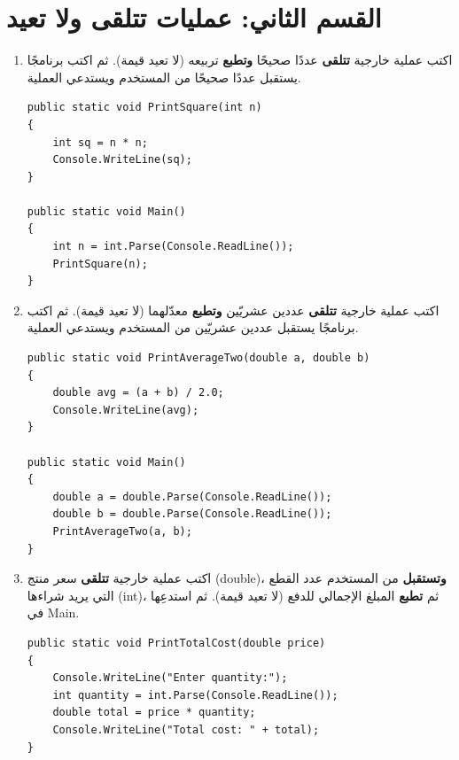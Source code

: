 \documentclass[14pt]{extarticle}
\begin{document}
\filbreak
\section*{القسم الثاني: عمليات تتلقى ولا تعيد}

\begin{enumerate}[resume, itemsep=1em]

\item اكتب عملية خارجية \textbf{تتلقى} عددًا صحيحًا \textbf{وتطبع} تربيعه (لا تعيد قيمة). ثم اكتب برنامجًا يستقبل عددًا صحيحًا من المستخدم ويستدعي العملية.
\ifwithsols
\begin{boxSolution}
\begin{english}
\begin{verbatim}
public static void PrintSquare(int n)
{
    int sq = n * n;
    Console.WriteLine(sq);
}

public static void Main()
{
    int n = int.Parse(Console.ReadLine());
    PrintSquare(n);
}
\end{verbatim}
\end{english}
\end{boxSolution}
\fi
\filbreak

\item اكتب عملية خارجية \textbf{تتلقى} عددين عشريّين \textbf{وتطبع} معدّلهما (لا تعيد قيمة). ثم اكتب برنامجًا يستقبل عددين عشريّين من المستخدم ويستدعي العملية.
\ifwithsols
\begin{boxSolution}
\begin{english}
\begin{verbatim}
public static void PrintAverageTwo(double a, double b)
{
    double avg = (a + b) / 2.0;
    Console.WriteLine(avg);
}

public static void Main()
{
    double a = double.Parse(Console.ReadLine());
    double b = double.Parse(Console.ReadLine());
    PrintAverageTwo(a, b);
}
\end{verbatim}
\end{english}
\end{boxSolution}
\fi
\filbreak

\item اكتب عملية خارجية \textbf{تتلقى} سعر منتج (\textenglish{double})، \textbf{وتستقبل} من المستخدم عدد القطع التي يريد شراءها (\textenglish{int})، ثم \textbf{تطبع} المبلغ الإجمالي للدفع (لا تعيد قيمة). ثم استدعِها في \textenglish{Main}.
\ifwithsols
\begin{boxSolution}
\begin{english}
\begin{verbatim}
public static void PrintTotalCost(double price)
{
    Console.WriteLine("Enter quantity:");
    int quantity = int.Parse(Console.ReadLine());
    double total = price * quantity;
    Console.WriteLine("Total cost: " + total);
}


\end{verbatim}
\end{english}
\end{boxSolution}
\end{enumerate}
\end{document}
